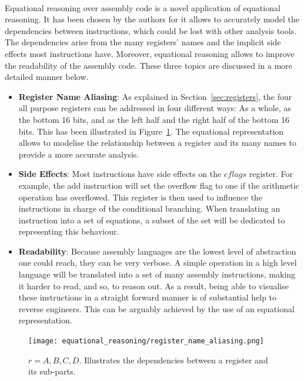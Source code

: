\paragraph{}
Equational reasoning over assembly code is a novel application of equational reasoning. It has been chosen by the authors for it allows to accurately model the dependencies between instructions, which could be lost with other analysis tools. The dependencies arise from the many registers' names and the implicit side effects most instructions have. Moreover, equational reasoning allows to improve the readability of the assembly code. These three topics are discussed in a more detailed manner below.

\begin{itemize}
	\item \textbf{Register Name Aliasing}: As explained in Section~\ref{sec:registers}, the four all purpose registers can be addressed in four different ways: As a whole, as the bottom 16 bits, and as the left half and the right half of the bottom 16 bits. This has been illustrated in Figure~\ref{fig:register_name_aliasing}. The equational representation allows to modelise the relationship between a register and its many names to provide a more accurate analysis.    
	\item \textbf{Side Effects}: Most instructions have side effects on the $eflags$ register. For example, the add instruction will set the overflow flag to one if the arithmetic operation has overflowed. This register is then used to influence the instructions in charge of the conditional branching. When translating an instruction into a set of equations, a subset of the set will be dedicated to representing this behaviour. 
	\item \textbf{Readability}: Because assembly languages are the lowest level of abstraction one could reach, they can be very verbose. A simple operation in a high level language will be translated into a set of many assembly instructions, making it harder to read, and so, to reason out. As a result, being able to visualise these instructions in a straight forward manner is of substantial help to reverse engineers. This can be arguably achieved by the use of an equational representation.
\end{itemize}

\begin{figure}[!htb]
	\centering
	\texttt{[image: equational\_reasoning/register\_name\_aliasing.png]}
	\caption{$r = {A, B, C, D}$. Illustrates the dependencies between a register and its sub-parts.}
	\label{fig:register_name_aliasing}
\end{figure}


